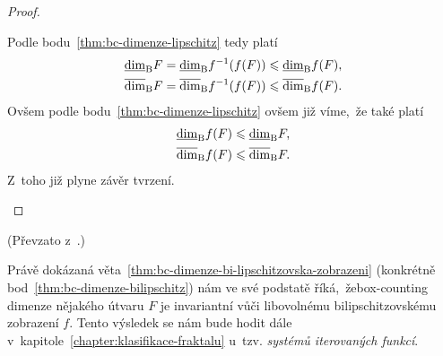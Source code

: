 \begin{proof}
\begin{enumerate}[label=\textit{(\roman*)}]
        Podle bodu~\ref{thm:bc-dimenze-lipschitz} tedy platí
        \begin{align*}
            \underline{\dim}_\textup{B}{F}&=\underline{\dim}_\textup{B}{f^{-1}(f(F))}\leqslant\underline{\dim}_\textup{B}{f(F)},\\
            \overline{\dim}_\textup{B}{F}&=\overline{\dim}_\textup{B}{f^{-1}(f(F))}\leqslant\overline{\dim}_\textup{B}{f(F)}.
        \end{align*}
        Ovšem podle bodu~\ref{thm:bc-dimenze-lipschitz} ovšem již víme,~že také platí
        \begin{align*}
            \underline{\dim}_\textup{B}{f(F)}&\leqslant\underline{\dim}_\textup{B}{F},\\
            \overline{\dim}_\textup{B}{f(F)}&\leqslant\overline{\dim}_\textup{B}{F}.
        \end{align*}
        Z~toho již plyne závěr tvrzení.
    \end{enumerate}
\end{proof}
(Převzato z~\citep[str. 36]{Falconer2014}.)

Právě dokázaná věta~\ref{thm:bc-dimenze-bi-lipschitzovska-zobrazeni} (konkrétně bod~\ref{thm:bc-dimenze-bilipschitz}) nám ve své podstatě říká,~že\linebreak{}box-counting dimenze nějakého útvaru $F$ je invariantní vůči libovolnému bilipschitzovskému zobrazení $f$. Tento výsledek se nám bude hodit dále v~kapitole~\ref{chapter:klasifikace-fraktalu} u~tzv. \emph{systémů iterovaných funkcí}.